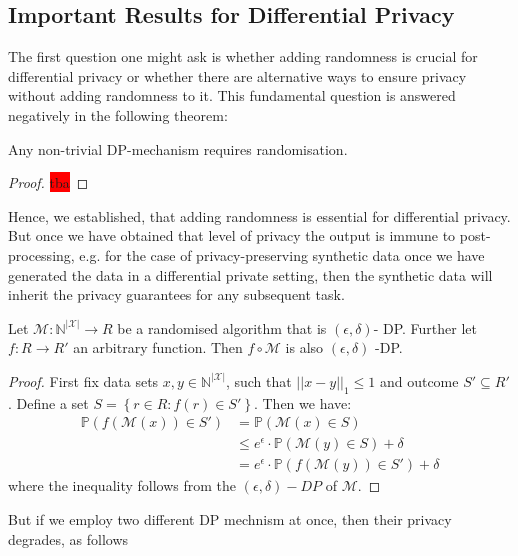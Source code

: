 \subsection{Important Results for Differential Privacy}
The first question one might ask is whether adding randomness is crucial for differential privacy or whether there are alternative ways to ensure privacy without adding randomness to it. This fundamental question is answered negatively in the following theorem:
\begin{thm} \label{thm:dp_random}
    Any non-trivial DP-mechanism requires randomisation.
\end{thm}
\begin{proof}
    \colorbox{red}{tba}
\end{proof}

Hence, we established, that adding randomness is essential for differential privacy. But once we have obtained that level of privacy the output is immune to post-processing, e.g. for the case of privacy-preserving synthetic data once we have generated the data in a differential private setting, then the synthetic data will inherit the privacy guarantees for any subsequent task.

\begin{thm} \label{thm:postpro}
    Let $\mathcal{M}: \mathbb{N}^{|\mathcal{X}|} \rightarrow R$ be a randomised algorithm that is $(\epsilon, \delta)$- DP. Further let $f: R \rightarrow R'$ an arbitrary function. Then $f \circ \mathcal{M}$ is also $(\epsilon, \delta)$ -DP.
\end{thm}
\begin{proof}
    First fix data sets $x,y \in \mathbb{N}^{|\mathcal{X}|}$, such that $||x-y||_1\le 1$ and outcome $S' \subseteq R'$. Define a set $S=\left\{r\in R: f(r) \in S'\right\}$. Then we have:
    \begin{align}
        \mathbb{P}(f(\mathcal{M}(x))\in S') &= \mathbb{P}(\mathcal{M}(x)\in S) \nonumber \\
        &\le e^\epsilon \cdot \mathbb{P}(\mathcal{M}(y)\in S) + \delta \nonumber \\
        &= e^\epsilon \cdot \mathbb{P}(f(\mathcal{M}(y))\in S') + \delta
    \end{align}
    where the inequality follows from the $(\epsilon, \delta)-DP$ of $\mathcal{M}$.
\end{proof}

But if we employ two different DP mechnism at once, then their privacy degrades, as follows

